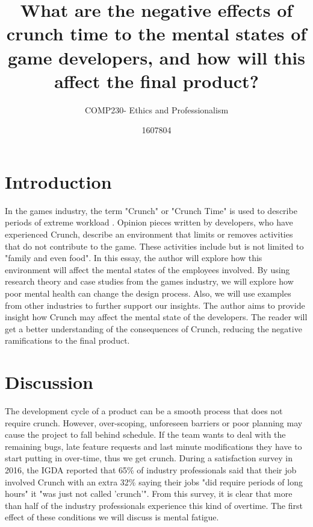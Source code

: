 \documentclass{scrartcl}
\title{What are the negative effects of crunch time to the mental states of game developers, and how will this affect the final product? }
\subtitle{COMP230- Ethics and Professionalism}
\author{1607804}
\begin{document}
\maketitle


\section{Introduction}In the games industry, the term "Crunch" or "Crunch Time" is used to describe periods of extreme workload \cite[p. 468]{edholm2017crunch}. Opinion pieces written by developers, who have experienced Crunch, describe an environment that limits or removes activities that do not contribute to the game. These activities include but is not limited to "family and even food"\cite{schreier_2017}. In this essay, the author will explore how this environment will affect the mental states of the employees involved. By using research theory and case studies from the games industry, we will explore how poor mental health can change the design process. Also, we will use examples from other industries to further support our insights. The author aims to provide insight how Crunch may affect the mental state of the developers. The reader will get a better understanding of the consequences of Crunch, reducing the negative ramifications to the final product.

\section{Discussion}
The development cycle of a product can be a smooth process that does not require crunch. However,  over-scoping, unforeseen barriers or poor planning may cause the project to fall behind schedule. If the team wants to deal with the remaining bugs, late feature requests and last minute modifications they have to start putting in over-time, thus we get crunch\cite{onlineWebl}\cite{edholm2017crunch}. During a satisfaction survey in 2016, the IGDA reported that 65\%  of industry professionals said that their job involved Crunch with an extra 32\%  saying their jobs "did require periods of long hours" it "was just not called 'crunch'"\cite[p.20]{weststarlegault2016}. From this survey, it is clear that more than half of the industry professionals experience this kind of overtime. The first effect of these conditions we will discuss is mental fatigue.
\end{document}

